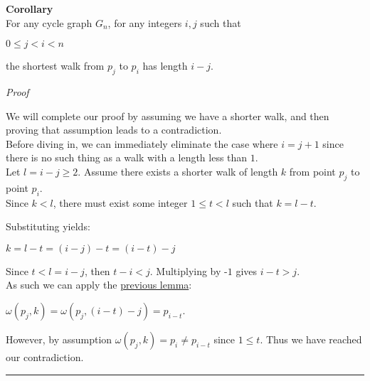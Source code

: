 \documentclass[a4paper,12pt]{article}
\begin{document}
\label{corollary:shortest_walk_1}
\begin{tcolorbox}
\textbf{Corollary}\\
For any cycle graph $G_n$, for any integers $i, j$ such that

\begin{center}
$0 \leq j < i < n$
\end{center}

\noindent the shortest walk from $p_j$ to $p_i$ has length $i - j$.
\end{tcolorbox}

\noindent
\textit{Proof}

\noindent We will complete our proof by assuming we have a shorter walk, and then proving that assumption leads to a contradiction.\\

\noindent Before diving in, we can immediately eliminate the case where $i = j + 1$ since there is no such thing as a walk with a length less than $1$.\\

\noindent Let $l = i - j \geq 2$. Assume there exists a shorter walk of length $k$ from point $p_j$ to point $p_i$.\\

\noindent Since $k < l$, there must exist some integer $1 \leq t < l$ such that $k = l - t$.

\noindent Substituting yields:
\begin{center}
$k = l - t = (i - j) - t = (i - t) - j$
\end{center}

\noindent Since $t < l = i - j$, then $t - i < j$. Multiplying by -$1$ gives $i - t > j$.\\

\noindent As such we can apply the \hyperref[lemma:existence_of_walk_1]{previous lemma}:
\begin{center}
$\omega(p_j, k) = \omega(p_j, (i - t) - j) = p_{i - t}$.
\end{center}

\noindent However, by assumption $\omega(p_j, k) = p_i \neq p_{i - t}$ since $1 \leq t$. Thus we have reached our contradiction.

\begin{center}
\noindent\rule{8cm}{0.4pt}
\end{center}
\end{document}
